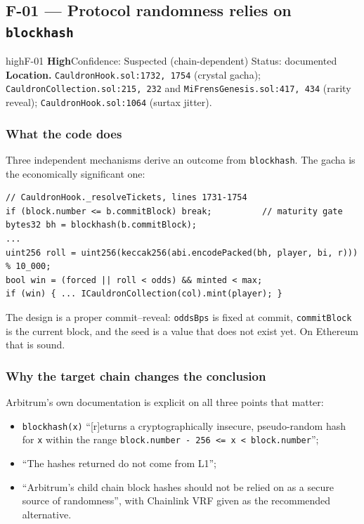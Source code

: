 \documentclass[11pt,a4paper]{article}
\newcommand{\code}[1]{\texttt{\small #1}}
\newcommand{\fileref}[1]{\texttt{\scriptsize #1}}
\begin{document}
\newpage
\subsection{F-01 --- Protocol randomness relies on \texorpdfstring{\code{blockhash}}{blockhash}}

\begin{findingbox}{high}{F-01 \quad \textbf{High}\quad Confidence: Suspected (chain-dependent) \quad Status: documented}
\textbf{Location.} \fileref{CauldronHook.sol:1732, 1754} (crystal gacha);
\fileref{CauldronCollection.sol:215, 232} and \fileref{MiFrensGenesis.sol:417, 434}
(rarity reveal); \fileref{CauldronHook.sol:1064} (surtax jitter).
\end{findingbox}

\subsubsection*{What the code does}

Three independent mechanisms derive an outcome from \code{blockhash}. The gacha is
the economically significant one:

\begin{lstlisting}
// CauldronHook._resolveTickets, lines 1731-1754
if (block.number <= b.commitBlock) break;          // maturity gate
bytes32 bh = blockhash(b.commitBlock);
...
uint256 roll = uint256(keccak256(abi.encodePacked(bh, player, bi, r))) % 10_000;
bool win = (forced || roll < odds) && minted < max;
if (win) { ... ICauldronCollection(col).mint(player); }
\end{lstlisting}

The design is a proper commit--reveal: \code{oddsBps} is fixed at commit,
\code{commitBlock} is the current block, and the seed is a value that does not
exist yet. On Ethereum that is sound.

\subsubsection*{Why the target chain changes the conclusion}

Arbitrum's own documentation is explicit on all three points that matter:

\begin{itemize}
\item \code{blockhash(x)} ``[r]eturns a cryptographically insecure, pseudo-random
hash for \code{x} within the range \code{block.number - 256 <= x < block.number}'';
\item ``The hashes returned do not come from L1'';
\item ``Arbitrum's child chain block hashes should not be relied on as a secure
source of randomness'', with Chainlink VRF given as the recommended alternative.
\end{itemize}
\end{document}
